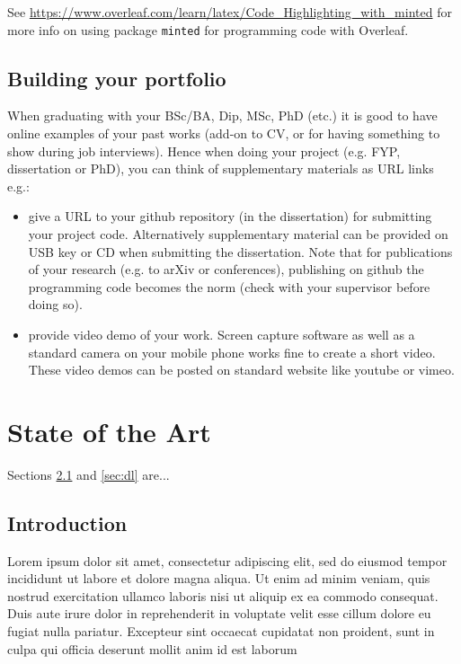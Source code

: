 \documentclass[english,a4paper,11pt,oneside,onecolumn]{book}
\begin{document}
See \url{https://www.overleaf.com/learn/latex/Code\_Highlighting\_with\_minted} for more info on using  package \texttt{minted} for programming code with Overleaf.

\section{Building your portfolio }

When graduating with your BSc/BA, Dip,  MSc, PhD (etc.) it is good to have online examples of your past works (add-on to CV, or for having something to show during job interviews).
Hence when doing your project (e.g. FYP, dissertation or PhD), you can think of supplementary materials as URL links e.g.:
\begin{itemize}
\item give a URL to your github repository (in the dissertation)  for submitting your project code. Alternatively supplementary material can be provided on USB key or CD when submitting the dissertation. Note that for publications of your research (e.g. to arXiv or conferences), publishing on github the programming code becomes the norm (check with your supervisor before doing so).
\item  provide video demo of your work. Screen capture software as well as a standard camera on your mobile phone works fine to create a short video. These video demos can be posted on standard website like youtube or vimeo.
\end{itemize}



\chapter{State of the Art}
\label{sec:soa}


Sections \ref{sec:int1} and \ref{sec:dl} are...

\section{Introduction}
\label{sec:int1}
Lorem ipsum dolor sit amet, consectetur adipiscing elit, sed do eiusmod tempor incididunt ut labore et dolore magna aliqua. Ut enim ad minim veniam, quis nostrud exercitation ullamco laboris nisi ut aliquip ex ea commodo consequat. Duis aute irure dolor in reprehenderit in voluptate velit esse cillum dolore eu fugiat nulla pariatur. Excepteur sint occaecat cupidatat non proident, sunt in culpa qui officia deserunt mollit anim id est laborum
\end{document}
